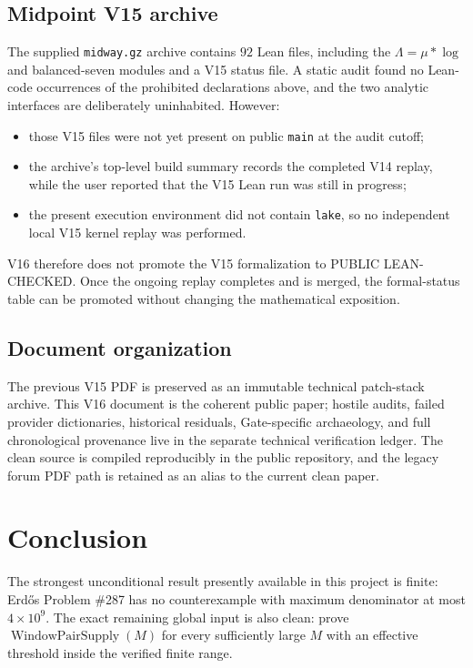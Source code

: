 \documentclass[11pt]{article}
\theoremstyle{definition}
\newcommand{\1}{\mathbf 1}
\newcommand{\WPS}{\operatorname{WindowPairSupply}}
\newcommand{\status}[1]{\textsf{#1}}
\begin{document}
\subsection{Midpoint V15 archive}
The supplied \texttt{midway.gz} archive contains $92$ Lean files, including the
$\Lambda=\mu*\log$ and balanced-seven modules and a V15 status file.  A static audit found
no Lean-code occurrences of the prohibited declarations above, and the two analytic
interfaces are deliberately uninhabited.  However:
\begin{itemize}[leftmargin=1.6em]
\item those V15 files were not yet present on public \texttt{main} at the audit cutoff;
\item the archive's top-level build summary records the completed V14 replay, while the user
reported that the V15 Lean run was still in progress;
\item the present execution environment did not contain \texttt{lake}, so no independent
local V15 kernel replay was performed.
\end{itemize}
V16 therefore does not promote the V15 formalization to \status{PUBLIC LEAN-CHECKED}.
Once the ongoing replay completes and is merged, the formal-status table can be promoted
without changing the mathematical exposition.

\subsection{Document organization}
The previous V15 PDF is preserved as an immutable technical patch-stack archive.  This
V16 document is the coherent public paper; hostile audits, failed provider dictionaries,
historical residuals, Gate-specific archaeology, and full chronological provenance live in
the separate technical verification ledger.  The clean source is compiled reproducibly in
the public repository, and the legacy forum PDF path is retained as an alias to the current
clean paper.

\section{Conclusion}

The strongest unconditional result presently available in this project is finite:
Erd\H{o}s Problem \#287 has no counterexample with maximum denominator at most
$4\times10^9$.  The exact remaining global input is also clean: prove $\WPS(M)$ for every
sufficiently large $M$ with an effective threshold inside the verified finite range.
\end{document}
